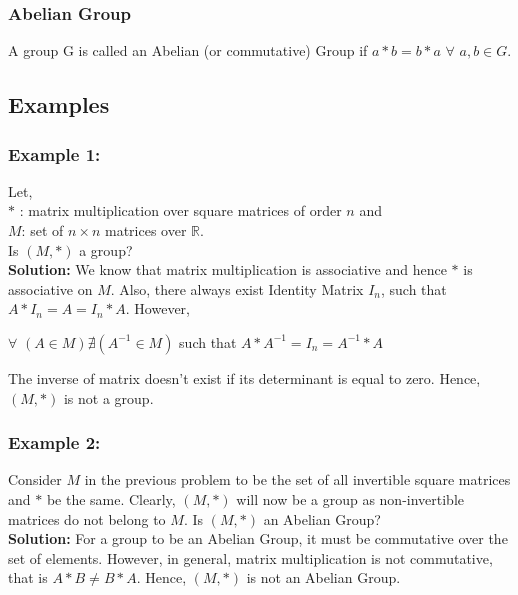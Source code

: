 \documentclass[11pt]{article}
\begin{document}
\subsubsection{Abelian Group}
A group G is called an Abelian (or commutative) Group if $a * b = b * a$ $\forall$ $a,b \in G$.\\

\subsection{Examples}
\subsubsection{Example 1:}
Let,\\
$*$ : matrix multiplication over square matrices of order $n$ and\\
$M$: set of $n \times n$ matrices over $\mathbb{R}$.\\
Is $(M, *)$ a group?\\
\textbf{Solution:} We know that matrix multiplication is associative and hence $*$ is associative on $M$. Also, there always exist Identity Matrix $I_n$, such that $A * I_n = A = I_n * A$. However, 
\begin{center}
    $\forall$ $(A \in M) \nexists (A^{-1} \in M)$ such that $A * A^{-1} = I_n = A^{-1} * A$
\end{center}
The inverse of matrix doesn't exist if its determinant is equal to zero. Hence, $(M, *)$ is not a group.\\

\subsubsection{Example 2:}
Consider $M$ in the previous problem to be the set of all invertible square matrices and $*$ be the same. Clearly, $(M, *)$ will now be a group as non-invertible matrices do not belong to $M$. Is $(M, *)$ an Abelian Group?
\\
\textbf{Solution:} For a group to be an Abelian Group, it must be commutative over the set of elements. However, in general, matrix multiplication is not commutative, that is $A * B \neq B * A$. Hence, $(M, *)$ is not an Abelian Group.\\
\end{document}
